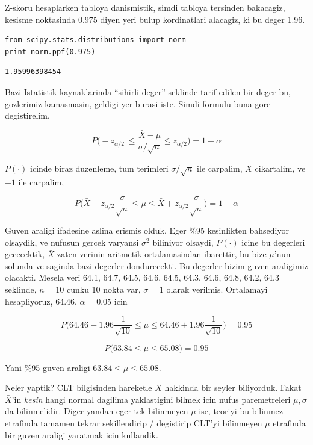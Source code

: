 \documentclass[12pt,fleqn]{article}\usepackage{../common}
\begin{document}
Z-skoru hesaplarken tabloya danismistik, simdi tabloya tersinden bakacagiz,
kesisme noktasinda 0.975 diyen yeri bulup kordinatlari alacagiz, ki bu
deger 1.96. 

\begin{verbatim}
from scipy.stats.distributions import norm
print norm.ppf(0.975)
\end{verbatim}

\begin{verbatim}
1.95996398454
\end{verbatim}

Bazi Istatistik kaynaklarinda ``sihirli deger'' seklinde tarif edilen bir
deger bu, gozlerimiz kamasmasin, geldigi yer burasi iste. Simdi formulu
buna gore degistirelim,

$$ 
P \bigg( 
-z_{\alpha/2} \
\le \frac{\bar{X} - \mu}{\sigma / \sqrt{n}} 
\le z_{\alpha/2}
\bigg) = 1-\alpha
 $$

$P(\cdot)$ icinde biraz duzenleme, tum terimleri $\sigma / \sqrt{n}$ ile
carpalim, $\bar{X}$ cikartalim, ve $-1$ ile carpalim,

$$ 
P \bigg( 
\bar{X} - z_{\alpha/2}\frac{\sigma}{\sqrt{n}}
\le \mu
\le \bar{X} + z_{\alpha/2}\frac{\sigma}{\sqrt{n}}
\bigg) = 1-\alpha
 $$

Guven araligi ifadesine aslina erismis olduk. Eger \%95 kesinlikten
bahsediyor olsaydik, ve nufusun gercek varyansi $\sigma^2$ biliniyor
olsaydi, $P(\cdot)$ icine bu degerleri gececektik, $\bar{X}$ zaten verinin
aritmetik ortalamasindan ibarettir, bu bize $\mu$'nun solunda ve saginda
bazi degerler dondurecekti. Bu degerler bizim guven araligimiz
olacakti. Mesela veri 64.1, 64.7, 64.5, 64.6, 64.5, 64.3, 64.6, 64.8,
64.2, 64.3 seklinde, $n=10$ cunku 10 nokta var, $\sigma = 1$ olarak
verilmis.  Ortalamayi hesapliyoruz, 64.46. $\alpha=0.05$ icin

$$ 
P \bigg( 
64.46 - 1.96\frac{1}{\sqrt{10}}
\le \mu
\le 64.46 + 1.96\frac{1}{\sqrt{10}}
\bigg) = 0.95
 $$

$$ P\bigg(63.84 \le \mu \le 65.08\bigg) = 0.95 $$

Yani \%95 guven araligi $63.84 \le \mu \le 65.08$. 

Neler yaptik? CLT bilgisinden hareketle $\bar{X}$ hakkinda bir seyler
biliyorduk. Fakat $\bar{X}$'in {\em kesin} hangi normal dagilima
yaklastigini bilmek icin nufus paremetreleri $\mu,\sigma$ da
bilinmelidir. Diger yandan eger tek bilinmeyen $\mu$ ise, teoriyi bu
bilinmez etrafinda tamamen tekrar sekillendirip / degistirip CLT'yi
bilinmeyen $\mu$ etrafinda bir guven araligi yaratmak icin kullandik.
\end{document}

